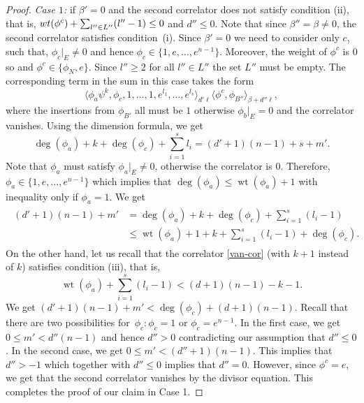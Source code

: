 \documentclass[10pt,a4paper]{article}
\numberwithin{equation}{section}
\begin{document}
\begin{proof}
{\em Case $1$:} if $\beta'=0$ and the second correlator does not satisfy condition (ii), that is,
${\rm wt}(\phi^c)+\sum_{l''\in L''} (l''-1) \leq 0$ and $d''\leq 0$. Note that since $\beta''=\beta\neq 0$, the second correlator satisfies condition~(i). Since $\beta'=0$ we need to consider only $c$, such that,
$\phi_c|_{E}\neq 0$ and hence ${\phi_c\in \big\{ 1, e, \dots, e^{n-1}\big\}}$. Moreover, the weight of $\phi^c$ is $0$
so  and $\phi^c\in \{\phi_N, e\}$. Since $l''\geq 2$ for all $l''\in L''$ the set
$L''$ must be empty. The corresponding term in the sum in this case takes the form
\[
\big\langle \phi_a\psi^k, \phi_c,1,\dots,1, e^{l_1},\dots, e^{l_s}\big\rangle_{d'\ell}
\langle \phi^c, \phi_{B''}\rangle_{\beta +d''\ell},
\]
where the insertions from $\phi_{B'}$ all must be $1$ otherwise ${\phi_b}|_E=0$ and the correlator vanishes.
Using the dimension formula, we get
\[
\operatorname{deg}(\phi_a) + k + \operatorname{deg}(\phi_c) +\sum_{i=1}^s l_i =
(d'+1)(n-1) + s + m'.
\]
Note that $\phi_a$ must satisfy $\phi_a|_E\neq 0$, otherwise the correlator is 0. Therefore,
$\phi_a\in \big\{ 1,e,\dots,e^{n-1} \big\}$ which implies that $\operatorname{deg}(\phi_a)\leq \operatorname{wt}(\phi_a)+1$ with inequality only if $\phi_a=1$. We get
\begin{align*}
\begin{aligned}
(d'+1)(n-1) + m' &=
\operatorname{deg}(\phi_a) + k + \operatorname{deg}(\phi_c) +\sum_{i=1}^s (l_i-1)\\
&\leq
\operatorname{wt}(\phi_a)+1+k + \sum_{i=1}^s (l_i-1) + \operatorname{deg}(\phi_c).
\end{aligned}
\end{align*}
On the other hand, let us recall that the correlator \eqref{van-cor} (with $k+1$ instead of $k$) satisfies condition (iii), that is,
\[
\operatorname{wt}(\phi_a)+\sum_{i=1}^s (l_i-1)<(d+1)(n-1)-k-1.
\]
We get $(d'+1)(n-1) + m' < \operatorname{deg}(\phi_c) + (d+1)(n-1)$. Recall that there are two possibilities for~$\phi_c\colon \phi_c=1$ or $\phi_c=e^{n-1}$. In the first case, we get $0\leq m'<d''(n-1)$ and hence $d''>0$ contradicting our assumption that $d''\leq 0$. In the second case, we get $0\leq m'<(d''+1)(n-1)$. This implies that $d''>-1$ which together with $d''\leq 0$ implies that $d''=0$. However, since $\phi^c= e$, we get that the second correlator vanishes by the divisor equation. This completes the proof of our claim in Case 1.


\end{proof}
\end{document}
